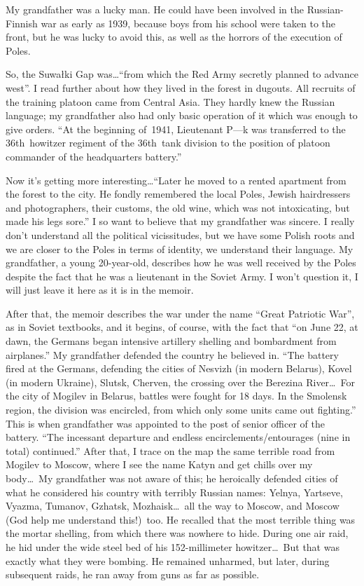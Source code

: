 My grandfather was a lucky man. He could have been involved in the
Russian-Finnish war as early as 1939, because boys from his school
were taken to the front, but he was lucky to avoid this, as well as
the horrors of the execution of Poles.

So, the Suwałki Gap was\ldots ``from which the Red Army secretly planned
to advance west''. I read further about how they lived in the forest in
dugouts. All recruits of the training platoon came from Central
Asia. They hardly knew the Russian language; my grandfather also had
only basic operation of it which was enough to give orders. ``At the
beginning of~1941, Lieutenant P---k was transferred to the 36th~howitzer
regiment of the 36th~tank division to the position of platoon
commander of the headquarters battery.''

Now it's getting more interesting\ldots ``Later he moved to a rented
apartment from the forest to the city. He fondly remembered the local
Poles, Jewish hairdressers and photographers, their customs, the old
wine, which was not intoxicating, but made his legs sore.'' I so want
to believe that my grandfather was sincere. I really don't understand
all the political vicissitudes, but we have some Polish roots and we
are closer to the Poles in terms of identity, we understand their
language. My grandfather, a young 20-year-old, describes how he was
well received by the Poles despite the fact that he was a lieutenant
in the Soviet Army. I won't question it, I will just leave it here as
it is in the memoir.

After that, the memoir describes the war under the name ``Great
Patriotic War'', as in Soviet textbooks, and it begins, of course, with
the fact that ``on June 22, at dawn, the Germans began intensive
artillery shelling and bombardment from airplanes.'' My grandfather
defended the country he believed in. ``The battery fired at the
Germans, defending the cities of Nesvizh (in modern Belarus), Kovel
(in modern Ukraine), Slutsk, Cherven, the crossing over the Berezina
River\ldots\ For the city of Mogilev in Belarus, battles were fought
for 18 days. In the Smolensk region, the division was encircled, from
which only some units came out fighting.'' This is when grandfather was
appointed to the post of senior officer of the battery. ``The
incessant departure and endless encirclements/entourages (nine in
total) continued.'' After that, I trace on the map the same terrible
road from Mogilev to Moscow, where I see the name Katyn and get chills
over my body\ldots\ My grandfather was not aware of this; he heroically
defended cities of what he considered his country with terribly
Russian names: Yelnya, Yartseve, Vyazma, Tumanov, Gzhatsk,
Mozhaisk\ldots\ all the way to Moscow, and Moscow (God help me
understand this!)~too. He recalled that the most terrible thing was
the mortar shelling, from which there was nowhere to hide. During one
air raid, he hid under the wide steel bed of his 152-millimeter
howitzer\ldots\ But that was exactly what they were bombing. He
remained unharmed, but later, during subsequent raids, he ran away
from guns as far as possible.

